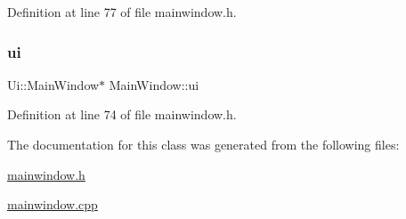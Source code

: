 Definition at line 77 of file mainwindow.\+h.

\mbox{\label{class_main_window_a35466a70ed47252a0191168126a352a5}} 
\subsubsection{\texorpdfstring{ui}{ui}}
{\footnotesize\ttfamily Ui\+::\+Main\+Window$\ast$ Main\+Window\+::ui\hspace{0.3cm}{\ttfamily [private]}}



Definition at line 74 of file mainwindow.\+h.



The documentation for this class was generated from the following files\+:\begin{DoxyCompactItemize}
\item 
\mbox{\hyperlink{mainwindow_8h}{mainwindow.\+h}}\item 
\mbox{\hyperlink{mainwindow_8cpp}{mainwindow.\+cpp}}\end{DoxyCompactItemize}
